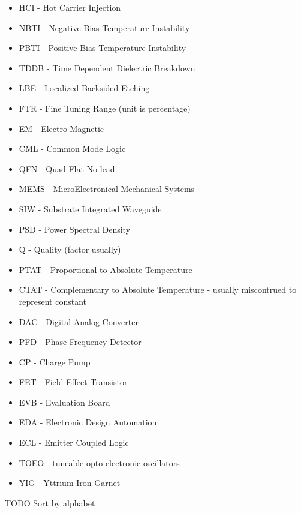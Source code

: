 \documentclass{article}
\begin{document}
\begin{itemize}

	\item HCI - Hot Carrier Injection
	\item NBTI - Negative-Bias Temperature Instability
	\item PBTI	- Positive-Bias Temperature Instability
	\item TDDB	- Time Dependent Dielectric Breakdown
	\item LBE 	- Localized Backsided Etching
	\item FTR	- Fine Tuning Range (unit is percentage)
	\item EM	- Electro Magnetic
	\item CML	- Common Mode Logic
	\item QFN	- Quad Flat No lead
	\item MEMS	- MicroElectronical Mechanical Systems
	\item SIW	- Substrate Integrated Waveguide
	\item PSD	- Power Spectral Density
	\item Q		- Quality (factor usually)
	\item PTAT	- Proportional to Absolute Temperature
	\item CTAT	- Complementary to Absolute Temperature - usually miscontrued to represent constant 
	\item DAC	- Digital Analog Converter
	\item PFD	- Phase Frequency Detector
	\item CP	- Charge Pump
	\item FET	- Field-Effect Transistor
	\item EVB	- Evaluation Board
	\item EDA	- Electronic Design Automation
	\item ECL - Emitter Coupled Logic
	\item TOEO - tuneable opto-electronic oscillators
	\item YIG - Yttrium Iron Garnet %
\end{itemize}

TODO Sort by alphabet

\newpage



\end{document}
